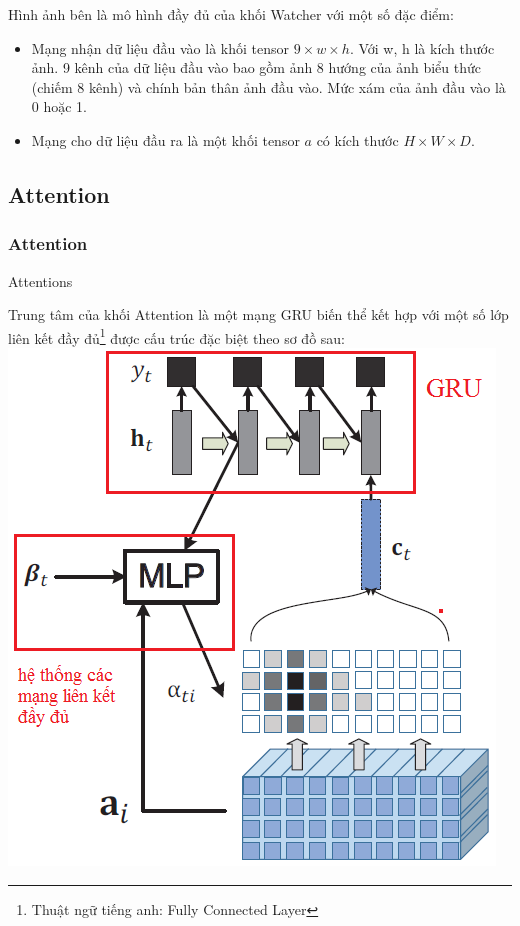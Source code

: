 \documentclass{beamer}
\begin{document}
\begin{frame}
	
	Hình ảnh bên là mô hình đầy đủ của khối Watcher với một số đặc điểm:
	\begin{itemize}
		\item Mạng nhận dữ liệu đầu vào là khối tensor $ 9 \times w \times h$. Với w, h là kích thước ảnh. 9 kênh của dữ liệu đầu vào bao gồm ảnh 8 hướng của ảnh biểu thức (chiếm 8 kênh) và chính bản thân ảnh đầu vào. Mức xám của ảnh đầu vào là 0 hoặc 1.
		\item Mạng cho dữ liệu đầu ra là một khối tensor $a$ có kích thước $H \times W \times D$.
	\end{itemize}

\end{frame}

\subsection{Attention}

\begin{frame}
	\frametitle{Attention}
	{\Huge Attentions}
\end{frame}

\begin{frame}
	Trung tâm của khối Attention là một mạng GRU biến thể kết hợp với một số lớp liên kết đầy đủ\footnote{Thuật ngữ tiếng anh: Fully Connected Layer} được cấu trúc đặc biệt theo sơ đồ sau:\\
	\includegraphics[width=0.5\linewidth]{Attention_img.png} 
\end{frame}
\end{document}
